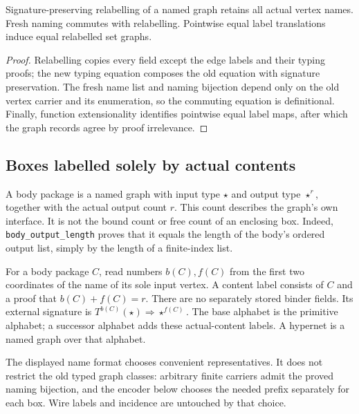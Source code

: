 \begin{lemma}
Signature-preserving relabelling of a named graph retains all actual vertex
names. Fresh naming commutes with relabelling. Pointwise equal label translations
induce equal relabelled set graphs.
\end{lemma}
\begin{proof}
Relabelling copies every field except the edge labels and their typing proofs;
the new typing equation composes the old equation with signature preservation.
The fresh name list and naming bijection depend only on the old vertex carrier
and its enumeration, so the commuting equation is definitional. Finally,
function extensionality identifies pointwise equal label maps, after which the
graph records agree by proof irrelevance.
\end{proof}

\subsection{Boxes labelled solely by actual contents}
\begin{definition}
A body package is a named graph with input type $\star$ and output type
$\star^r$, together with the actual output count $r$. This count describes the
graph's own interface. It is not the bound count or free count of an enclosing
box. Indeed, \texttt{body\_output\_length} proves that it equals the length of
the body's ordered output list, simply by the length of a finite-index list.
\end{definition}

\begin{definition}
For a body package $C$, read numbers $b(C),f(C)$ from the first two coordinates
of the name of its sole input vertex. A content label consists of $C$ and a
proof that $b(C)+f(C)=r$. There are no separately stored binder fields.
Its external signature is $T^{b(C)}(\star)\Rightarrow\star^{f(C)}$.
The base alphabet is the primitive alphabet; a successor alphabet adds these
actual-content labels. A hypernet is a named graph over that alphabet.
\end{definition}
The displayed name format chooses convenient representatives. It does not
restrict the old typed graph classes: arbitrary finite carriers admit the proved
naming bijection, and the encoder below chooses the needed prefix separately
for each box. Wire labels and incidence are untouched by that choice.


